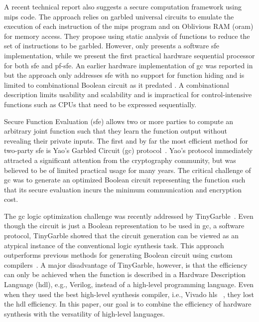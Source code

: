 A recent technical report \cite{wang2016secure} also suggests a secure computation framework using \acrshort{mips} code. The approach relies on garbled universal circuits to emulate the execution of each instruction of the \acrshort{mips} program and on Oblivious RAM (\acrshort{oram}) for memory access. They propose using static analysis of functions to reduce the set of instructions to be garbled. However, \cite{wang2016secure} only presents a software \acrshort{sfe} implementation, while we present the first practical hardware sequential processor for both \acrshort{sfe} and \acrshort{pf-sfe}. An earlier hardware implementation of \acrshort{gc} was reported in \cite{jarvinen2010garbled} but the approach only addresses \acrshort{sfe} with no support for function hiding and is limited to combinational Boolean circuit as it predated \cite{songhori2015tinygarble}. A combinational description limits usability and scalability and is impractical for control-intensive functions such as CPUs that need to be expressed sequentially.


Secure Function Evaluation (\acrshort{sfe}) allows two or more parties to compute an arbitrary joint function such that they learn the function output without revealing their private inputs.
The first and by far the most efficient method for two-party \acrshort{sfe} is Yao's Garbled Circuit (\acrshort{gc}) protocol~\cite{yao1986generate}.
Yao's protocol immediately attracted a significant attention from the cryptography community, but was believed to be of limited practical usage for many years.
The critical challenge of \acrshort{gc} was to generate an optimized Boolean circuit representing the function such that its secure evaluation incurs the minimum communication and encryption cost.

The \acrshort{gc} logic optimization challenge was recently addressed by TinyGarble~\cite{songhori2015tinygarble}.
Even though the circuit is just a Boolean representation to be used in \acrshort{gc}, a software protocol, TinyGarble showed that the circuit generation can be viewed as an atypical instance of the conventional logic synthesis task.
This approach outperforms previous methods for generating Boolean circuit using custom compilers~\cite{malkhi2004fairplay,holzer2012secure, rastogi2014wysteria,demmler2015aby,liu2015oblivm,mood2016frigate}.
A major disadvantage of TinyGarble, however, is that the efficiency can only be achieved when the function is described in a Hardware Description Language (\acrshort{hdl}), e.g., Verilog, instead of a high-level programming language.
Even when they used the best high-level synthesis compiler, i.e., Vivado \acrshort{hls} ~\cite{tool:Vivado}, they lost the \acrshort{hdl} efficiency.
In this paper, our goal is to combine the efficiency of hardware synthesis with the versatility of high-level languages.

